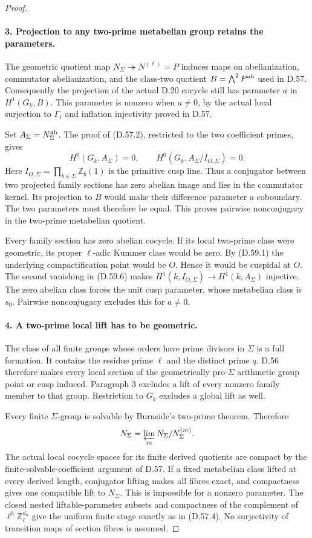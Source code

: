 \begin{proof}
\paragraph{3. Projection to any two-prime metabelian group retains the parameters.}

The geometric quotient map
$N_\Sigma\twoheadrightarrow N^{(\ell)}=P$
induces maps on abelianization, commutator
abelianization, and the class-two quotient
$B=\bigwedge^2P^{\rm ab}$ used in D.57.
Consequently the projection of the actual D.20
cocycle still has parameter $a$ in
$H^1(G_k,B)$.  This parameter is nonzero when
$a\ne0$, by the actual local surjection to
$\Gamma_\ell$ and inflation injectivity proved
in D.57.

Set $A_\Sigma=N_\Sigma^{\rm ab}$.  The proof
of (D.57.2), restricted to the two coefficient
primes, gives
\[
 H^0(G_k,A_\Sigma)=0,\qquad
 H^0(G_k,A_\Sigma/I_{O,\Sigma})=0.                    \tag{D.59.6}
\]
Here $I_{O,\Sigma}=\prod_{b\in\Sigma}\mathbb Z_b(1)$
is the primitive cusp line.  Thus a conjugator
between two projected family sections has zero
abelian image and lies in the commutator kernel.
Its projection to $B$ would make their difference
parameter a coboundary.  The two parameters must
therefore be equal.  This proves pairwise
nonconjugacy in the two-prime metabelian quotient.

Every family section has zero abelian cocycle.
If its local two-prime class were geometric, its
proper $\ell$-adic Kummer class would be zero.
By (D.59.1) the underlying compactification point
would be $O$.  Hence it would be cuspidal at
$O$.  The second vanishing in (D.59.6) makes
$H^1(k,I_{O,\Sigma})\to H^1(k,A_\Sigma)$
injective.  The zero abelian class forces the
unit cusp parameter, whose metabelian class is
$s_0$.  Pairwise nonconjugacy excludes this
for $a\ne0$.

\paragraph{4. A two-prime local lift has to be geometric.}

The class of all finite groups whose orders
have prime divisors in $\Sigma$ is a full
formation.  It contains the residue prime
$\ell$ and the distinct prime $q$.  D.56
therefore makes every local section of the
geometrically pro-$\Sigma$ arithmetic group
point or cusp induced.  Paragraph 3 excludes
a lift of every nonzero family member to
that group.  Restriction to $G_k$ excludes
a global lift as well.

Every finite $\Sigma$-group is solvable by
Burnside's two-prime theorem.  Therefore
\[
 N_\Sigma=\varprojlim_m
                 N_\Sigma/N_\Sigma^{(m)}.
\]
The actual local cocycle spaces for its
finite derived quotients are compact by
the finite-solvable-coefficient argument
of D.57.  If a fixed metabelian class
lifted at every derived length, conjugator
lifting makes all fibres exact, and
compactness gives one compatible lift to
$N_\Sigma$.  This is impossible for a
nonzero parameter.  The closed nested
liftable-parameter subsets and compactness
of the complement of
$\ell^h\mathbb Z_\ell^{d_n}$ give the
uniform finite stage exactly as in
(D.57.4).  No surjectivity of transition
maps of section fibres is assumed.
\end{proof}
